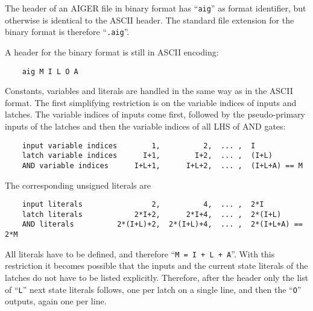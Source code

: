 \documentclass[10pt]{llncs}
\begin{document}
  The header of an AIGER file in binary format has ``\texttt{aig}'' as format
  identifier, but otherwise is identical to the ASCII header.  The standard
  file extension for the binary format is therefore ``\texttt{.aig}''. 
  
  A header for the binary format is still in ASCII encoding:
\begin{verbatim}
    aig M I L O A
\end{verbatim}
  Constants, variables and literals are handled in the same way as in the
  ASCII format.  The first simplifying restriction is on the variable
  indices of inputs and latches.  The variable indices of inputs come first,
  followed by the pseudo-primary inputs of the latches and then the variable
  indices of all LHS of AND gates:
\begin{verbatim}
    input variable indices        1,          2,  ... ,  I
    latch variable indices      I+1,        I+2,  ... ,  (I+L)
    AND variable indices      I+L+1,      I+L+2,  ... ,  (I+L+A) == M
\end{verbatim}
  The corresponding unsigned literals are
\begin{verbatim}
    input literals                2,          4,  ... ,  2*I
    latch literals            2*I+2,      2*I+4,  ... ,  2*(I+L)
    AND literals          2*(I+L)+2,  2*(I+L)+4,  ... ,  2*(I+L+A) == 2*M
\end{verbatim}
  All literals have to be defined, and therefore ``\texttt{M = I + L + A}''.  With this
  restriction it becomes possible that the inputs and the current state
  literals of the latches do not have to be listed explicitly.  Therefore,
  after the header only the list of ``\texttt{L}'' next state literals follows, one per
  latch on a single line, and then the ``\texttt{O}'' outputs, again one per line.
\end{document}
